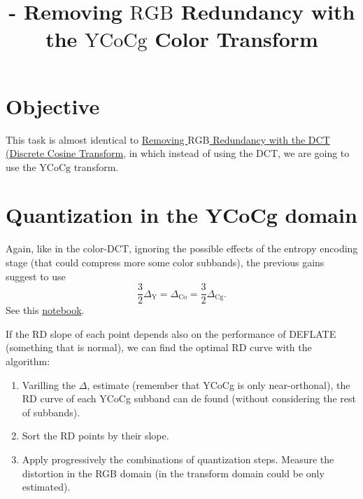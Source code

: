 

\title{\SM{} - Removing $\text{RGB}$ Redundancy with the $\text{YCoCg}$ Color Transform}

\maketitle
\tableofcontents

\section{Objective}
This task is almost identical to
\href{https://sistemas-multimedia.github.io/contents/YCoCg_SQ/}{Removing
  $\text{RGB}$ Redundancy with the DCT (Discrete Cosine Transform}, in
which instead of using the DCT, we are going to use the $\text{YCoCg}$
transform.

\section{Quantization in the YCoCg domain}


Again, like in the color-DCT, ignoring the possible effects of the
entropy encoding stage (that could compress more some color subbands),
the previous gains suggest to use
\begin{equation}
  \frac{3}{2}\Delta_{\text{Y}} = \Delta_{\text{Co}} = \frac{3}{2}\Delta_{\text{Cg}}.
\end{equation}
See this \href{https://github.com/Sistemas-Multimedia/Sistemas-Multimedia.github.io/blob/master/milestones/06-YUV_compression/YCrCb_matrix.ipynb}{notebook}.

If the RD slope of each point depends also on the performance of DEFLATE (something that is normal), we can find the optimal RD curve with the algorithm:
\begin{enumerate}
\item Varilling the $\Delta$, estimate (remember that YCoCg is only  near-orthonal), the RD curve of each YCoCg subband can de found (without considering the rest of subbands).
\item Sort the RD points by their slope.
\item Apply progressively the combinations of quantization
  steps. Measure the distortion in the RGB domain (in the transform
  domain could be only estimated).
\end{enumerate}


